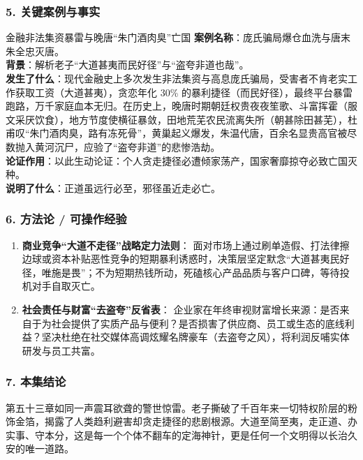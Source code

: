 \subsubsection{5. 关键案例与事实}
\begin{CaseBox}{金融非法集资暴雷与晚唐“朱门酒肉臭”亡国}
\textbf{案例名称}：庞氏骗局爆仓血洗与唐末朱全忠灭唐。\\
\textbf{背景}：解析老子“大道甚夷而民好径”与“盗夸非道也哉”。\\
\textbf{发生了什么}：现代金融史上多次发生非法集资与高息庞氏骗局，受害者不肯老实工作获取工资（大道甚夷），贪恋年化 30\% 的暴利捷径（而民好径），最终平台暴雷跑路，万千家庭血本无归。在历史上，晚唐时期朝廷权贵夜夜笙歌、斗富挥霍（服文采厌饮食），地方节度使横征暴敛，田地荒芜农民流离失所（朝甚除田甚芜），杜甫叹“朱门酒肉臭，路有冻死骨”，黄巢起义爆发，朱温代唐，百余名显贵高官被尽数抛入黄河沉尸，应验了“盗夸非道”的悲惨浩劫。\\
\textbf{论证作用}：以此生动论证：个人贪走捷径必遭倾家荡产，国家奢靡掠夺必致亡国灭种。\\
\textbf{说明了什么}：正道虽远行必至，邪径虽近走必亡。
\end{CaseBox}

\subsubsection{6. 方法论 / 可操作经验}
\begin{enumerate}
    \item \textbf{商业竞争“大道不走径”战略定力法则}：
    面对市场上通过刷单造假、打法律擦边球或资本补贴恶性竞争的短期暴利诱惑时，决策层坚定默念“大道甚夷民好径，唯施是畏”；不为短期热钱所动，死磕核心产品品质与客户口碑，等待投机对手自取灭亡。
    \item \textbf{社会责任与财富“去盗夸”反省表}：
    企业家在年终审视财富增长来源：是否来自于为社会提供了实质产品与便利？是否损害了供应商、员工或生态的底线利益？坚决杜绝在社交媒体高调炫耀名牌豪车（去盗夸之风），将利润反哺实体研发与员工共富。
\end{enumerate}

\subsubsection{7. 本集结论}
第五十三章如同一声震耳欲聋的警世惊雷。老子撕破了千百年来一切特权阶层的粉饰金箔，揭露了人类趋利避害却贪走捷径的悲剧根源。大道至简至夷，走正道、办实事、守本分，这是每一个个体不翻车的定海神针，更是任何一个文明得以长治久安的唯一道路。


